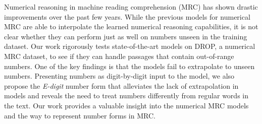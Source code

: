 Numerical reasoning in machine reading comprehension (MRC) has shown drastic improvements over the past few years. While the previous models for numerical MRC are able to interpolate the learned numerical reasoning capabilities, it is not clear whether they can perform just as well on numbers unseen in the training dataset. Our work rigorously tests state-of-the-art models on DROP, a numerical MRC dataset, to see if they can handle passages that contain out-of-range numbers. One of the key findings is that the models fail to extrapolate to unseen numbers. Presenting numbers as digit-by-digit input to the model, we also propose the \textit{E-digit} number form that alleviates the lack of extrapolation in models and reveals the need to treat numbers differently from regular words in the text. Our work provides a valuable insight into the numerical MRC models and the way to represent number forms in MRC.
